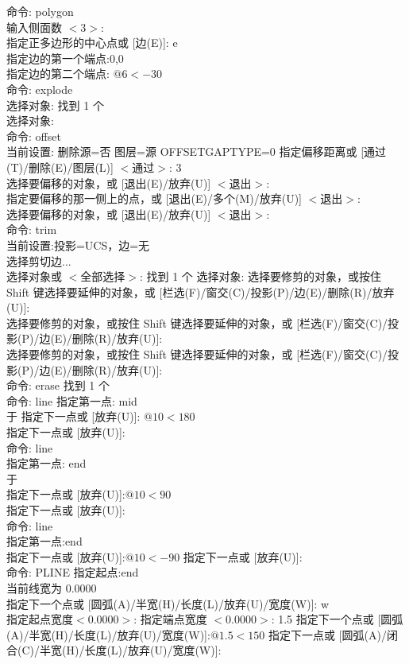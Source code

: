 \noindent
命令: polygon \\
输入侧面数 $<3>$:\\
指定正多边形的中心点或 [边(E)]: e\\
指定边的第一个端点:0,0\\
指定边的第二个端点: $@6<-30$\\
命令: explode\\
选择对象: 找到 1 个\\
选择对象:\\
命令: offset\\
当前设置: 删除源=否  图层=源  OFFSETGAPTYPE=0
指定偏移距离或 [通过(T)/删除(E)/图层(L)] $<$通过$>$: 3\\
选择要偏移的对象，或 [退出(E)/放弃(U)] $<$退出$>$:\\
指定要偏移的那一侧上的点，或 [退出(E)/多个(M)/放弃(U)] $<$退出$>$:\\
选择要偏移的对象，或 [退出(E)/放弃(U)] $<$退出$>$:\\
命令: trim\\
当前设置:投影=UCS，边=无\\
选择剪切边...\\
选择对象或 $<$全部选择$>$:  找到 1 个
选择对象:
选择要修剪的对象，或按住 Shift 键选择要延伸的对象，或
[栏选(F)/窗交(C)/投影(P)/边(E)/删除(R)/放弃(U)]:\\
选择要修剪的对象，或按住 Shift 键选择要延伸的对象，或
[栏选(F)/窗交(C)/投影(P)/边(E)/删除(R)/放弃(U)]:\\
选择要修剪的对象，或按住 Shift 键选择要延伸的对象，或
[栏选(F)/窗交(C)/投影(P)/边(E)/删除(R)/放弃(U)]:\\
命令: erase 找到 1 个\\
命令: line 指定第一点: mid\\
于
指定下一点或 [放弃(U)]: $@10<180$\\
指定下一点或 [放弃(U)]:\\
命令: line\\
指定第一点: end\\
于\\
指定下一点或 [放弃(U)]:$ @10<90$\\
指定下一点或 [放弃(U)]:\\
命令: line\\
指定第一点:end\\
指定下一点或 [放弃(U)]:$ @10<-90$
指定下一点或 [放弃(U)]:\\
命令: PLINE
指定起点:end\\
当前线宽为 0.0000\\
指定下一个点或 [圆弧(A)/半宽(H)/长度(L)/放弃(U)/宽度(W)]: w\\
指定起点宽度$ <$0.0000$>$:
指定端点宽度 $<$0.0000$>$: 1.5
指定下一个点或 [圆弧(A)/半宽(H)/长度(L)/放弃(U)/宽度(W)]:$ @1.5<150$
指定下一点或 [圆弧(A)/闭合(C)/半宽(H)/长度(L)/放弃(U)/宽度(W)]:\\

